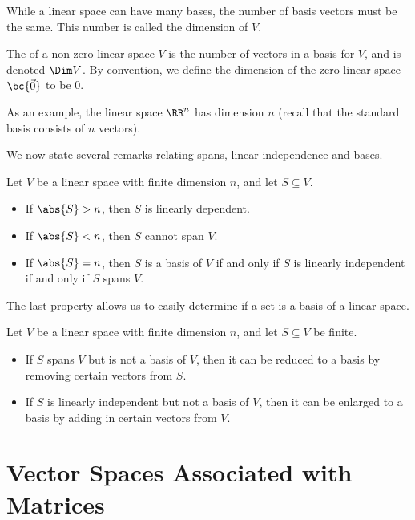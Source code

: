 While a linear space can have many bases, the number of basis vectors must be the same. This number is called the dimension of $V$.

\begin{definition}
    The  of a non-zero linear space $V$ is the number of vectors in a basis for $V$, and is denoted $\Dim V$. By convention, we define the dimension of the zero linear space $\bc{\vec 0}$ to be 0.
\end{definition}

As an example, the linear space $\RR^n$ has dimension $n$ (recall that the standard basis consists of $n$ vectors).

We now state several remarks relating spans, linear independence and bases.

\begin{proposition}
    Let $V$ be a linear space with finite dimension $n$, and let $S \subseteq V$.
    \begin{itemize}
        \item If $\abs{S} > n$, then $S$ is linearly dependent.
        \item If $\abs{S} < n$, then $S$ cannot span $V$.
        \item If $\abs{S} = n$, then $S$ is a basis of $V$ if and only if $S$ is linearly independent if and only if $S$ spans $V$.
    \end{itemize}
\end{proposition}

The last property allows us to easily determine if a set is a basis of a linear space.

\begin{proposition}
    Let $V$ be a linear space with finite dimension $n$, and let $S \subseteq V$ be finite.
    \begin{itemize}
        \item If $S$ spans $V$ but is not a basis of $V$, then it can be reduced to a basis by removing certain vectors from $S$.
        \item If $S$ is linearly independent but not a basis of $V$, then it can be enlarged to a basis by adding in certain vectors from $V$.
    \end{itemize}
\end{proposition}

\section{Vector Spaces Associated with Matrices}

